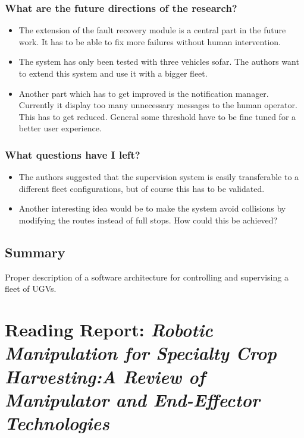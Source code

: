     \subsubsection*{What are the future directions of the research?}
    \begin{itemize}
        \item The extension of the fault recovery module is a central part in the future work. It has to be able to fix more failures without human intervention. 
        \item The system has only been tested with three vehicles sofar. The authors want to extend this system and use it with a bigger fleet.
        \item Another part which has to get improved is the notification manager. Currently it display too many unnecessary messages to the human operator. This has to get reduced. General some threshold have to be fine tuned for a better user experience.
    \end{itemize}
    \subsubsection*{What questions have I left?}
    \begin{itemize}
        \item The authors suggested that the supervision system is easily transferable to a different fleet configurations, but of course this has to be validated. 
        \item Another interesting idea would be to make the system avoid collisions by modifying the routes instead of full stops. How could this be achieved?
    \end{itemize}
    
    \subsection*{Summary}
    Proper description of a software architecture for controlling and supervising a fleet of UGVs.

    
    \newpage
    \section{Reading Report: \emph{Robotic Manipulation for Specialty Crop Harvesting:A Review of Manipulator and End-Effector Technologies}}
    \label{sec:Davidson2020}
    \cite{Davidson2020}
    
